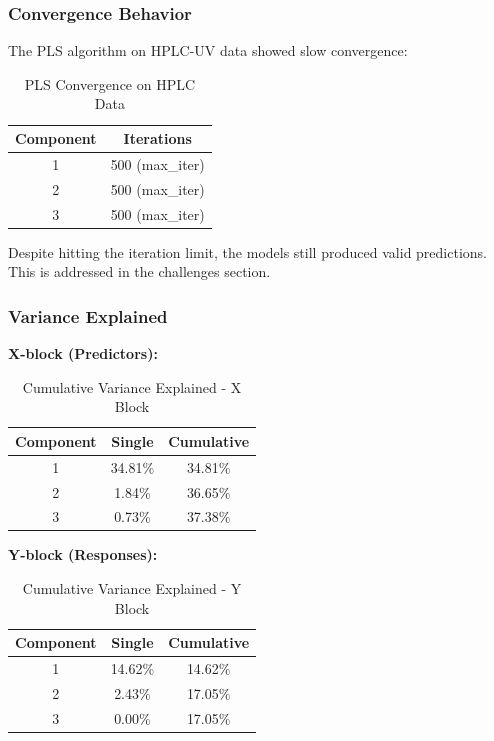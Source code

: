 \documentclass[12pt,a4paper]{article}
\begin{document}
\subsubsection{Convergence Behavior}

The PLS algorithm on HPLC-UV data showed slow convergence:

\begin{table}[H]
\centering
\caption{PLS Convergence on HPLC Data}
\begin{tabular}{cc}
\toprule
Component & Iterations \\
\midrule
1 & 500 (max\_iter) \\
2 & 500 (max\_iter) \\
3 & 500 (max\_iter) \\
\bottomrule
\end{tabular}
\end{table}

Despite hitting the iteration limit, the models still produced valid predictions. This is addressed in the challenges section.

\subsubsection{Variance Explained}

\textbf{X-block (Predictors):}
\begin{table}[H]
\centering
\caption{Cumulative Variance Explained - X Block}
\begin{tabular}{ccc}
\toprule
Component & Single & Cumulative \\
\midrule
1 & 34.81\% & 34.81\% \\
2 & 1.84\% & 36.65\% \\
3 & 0.73\% & 37.38\% \\
\bottomrule
\end{tabular}
\end{table}

\textbf{Y-block (Responses):}
\begin{table}[H]
\centering
\caption{Cumulative Variance Explained - Y Block}
\begin{tabular}{ccc}
\toprule
Component & Single & Cumulative \\
\midrule
1 & 14.62\% & 14.62\% \\
2 & 2.43\% & 17.05\% \\
3 & 0.00\% & 17.05\% \\
\bottomrule
\end{tabular}
\end{table}
\end{document}
